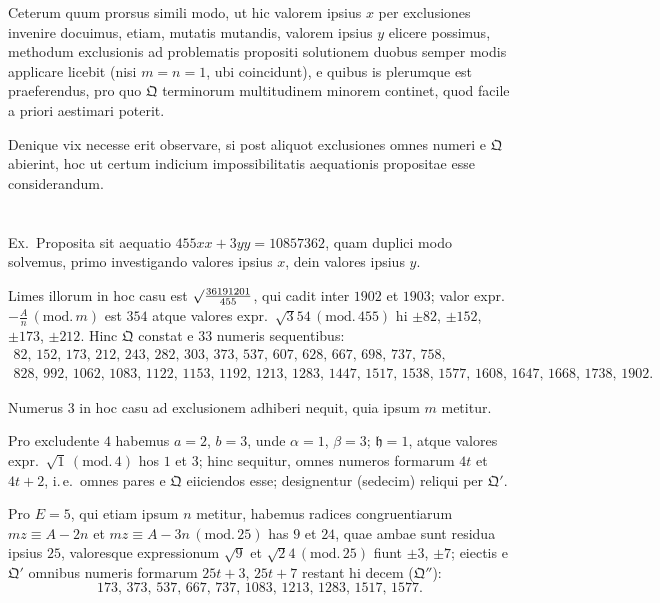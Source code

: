 \documentclass[12pt,a4paper]{article}
\theoremstyle{plain}
\theoremstyle{definition}
\theoremstyle{remark}
\newcommand{\Q}{\mathfrak{Q}}
\begin{document}
Ceterum quum prorsus simili modo, ut hic valorem ipsius $x$ per exclusiones invenire docuimus, etiam, mutatis mutandis, valorem ipsius $y$ elicere possimus, methodum exclusionis ad problematis propositi solutionem duobus semper modis applicare licebit (nisi $m=n=1$, ubi coincidunt), e quibus is plerumque est praeferendus, pro quo $\Q$ terminorum multitudinem minorem continet, quod facile a priori aestimari poterit.

Denique vix necesse erit observare, si post aliquot exclusiones omnes numeri e $\Q$ abierint, hoc ut certum indicium impossibilitatis aequationis propositae esse considerandum.

\section{}

\textsc{Ex.}\ Proposita sit aequatio $455xx+3yy=10857362$, quam duplici modo solvemus, primo investigando valores ipsius $x$, dein valores ipsius $y$.

Limes illorum in hoc casu est $\surd\frac{36191201}{455}$, qui cadit inter $1902$ et $1903$; valor expr.~$-\frac{A}{n}\,(\mathrm{mod.}\,m)$ est $354$ atque valores expr.~$\surd 354\,(\mathrm{mod.}\,455)$ hi $\pm 82$, $\pm 152$, $\pm 173$, $\pm 212$. Hinc $\Q$ constat e $33$ numeris sequentibus:
\begin{multline*}
82,\, 152,\, 173,\, 212,\, 243,\, 282,\, 303,\, 373,\, 537,\, 607,\, 628,\, 667,\, 698,\, 737,\, 758,\\
828,\, 992,\, 1062,\, 1083,\, 1122,\, 1153,\, 1192,\, 1213,\, 1283,\, 1447,\, 1517,\, 1538,\, 1577,\, 1608,\, 1647,\, 1668,\, 1738,\, 1902.
\end{multline*}

Numerus $3$ in hoc casu ad exclusionem adhiberi nequit, quia ipsum $m$ metitur.

Pro excludente $4$ habemus $a=2$, $b=3$, unde $\alpha=1$, $\beta=3$; $\mathfrak{h}=1$, atque valores expr.~$\surd 1\,(\mathrm{mod.}\,4)$ hos $1$ et $3$; hinc sequitur, omnes numeros formarum $4t$ et $4t+2$, i.\,e.\ omnes pares e $\Q$ eiiciendos esse; designentur (sedecim) reliqui per $\Q'$.

Pro $E=5$, qui etiam ipsum $n$ metitur, habemus radices congruentiarum $mz\equiv A-2n$ et $mz\equiv A-3n\,(\mathrm{mod.}\,25)$ has $9$ et $24$, quae ambae sunt residua ipsius $25$, valoresque expressionum $\surd 9$ et $\surd 24\,(\mathrm{mod.}\,25)$ fiunt $\pm 3$, $\pm 7$; eiectis e $\Q'$ omnibus numeris formarum $25t+3$, $25t+7$ restant hi decem ($\Q''$):
\[173,\, 373,\, 537,\, 667,\, 737,\, 1083,\, 1213,\, 1283,\, 1517,\, 1577.\]
\end{document}

